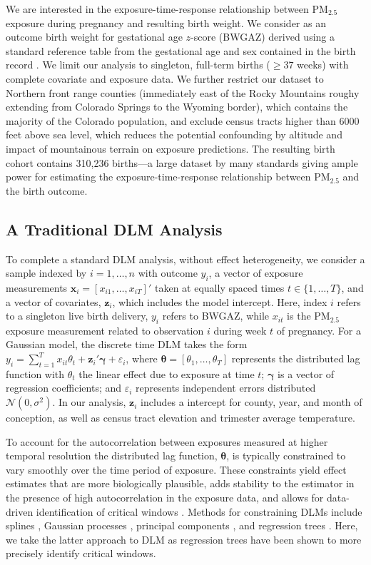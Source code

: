 \documentclass[12pt]{article}
\begin{document}
We are interested in the exposure-time-response relationship between PM$_{2.5}$ exposure during pregnancy and resulting birth weight. We consider as an outcome birth weight for gestational age $z$-score (BWGAZ) derived using a standard reference table from the gestational age and sex contained in the birth record \citep{Fenton2013AInfants}. We limit our analysis to singleton, full-term births ($\geq37$ weeks) with complete covariate and exposure data. We further restrict our dataset to Northern front range counties (immediately east of the Rocky Mountains roughy extending from Colorado Springs to the Wyoming border), which contains the majority of the Colorado population, and exclude census tracts higher than 6000 feet above sea level, which reduces the potential confounding by altitude and impact of mountainous terrain on exposure predictions. The resulting birth cohort contains 310,236 births---a large dataset by many standards giving ample power for estimating the exposure-time-response relationship between PM$_{2.5}$ and the birth outcome. 

\subsection{A Traditional DLM Analysis}\label{sec:tdlm_analysis}
To complete a standard DLM analysis, without effect heterogeneity, we consider a sample indexed by $i=1,\ldots,n$ with outcome $y_i$, a vector of exposure measurements $\mathbf{x}_i=[x_{i1},\ldots,x_{iT}]'$ taken at equally spaced times $t\in\{1,\ldots,T\}$, and a vector of covariates, $\mathbf{z}_i$, which includes the model intercept. Here, index $i$ refers to a singleton live birth delivery, $y_i$ refers to BWGAZ, while $x_{it}$ is the PM$_{2.5}$ exposure measurement related to observation $i$ during week $t$ of pregnancy. For a Gaussian model, the discrete time DLM takes the form $y_i=\sum_{t=1}^T x_{it}\theta_t+\mathbf{z}_i'\boldsymbol\gamma+\varepsilon_i$, where $\boldsymbol\theta=[\theta_1,\ldots,\theta_T]$ represents the distributed lag function with $\theta_t$ the linear effect due to exposure at time $t$; $\boldsymbol\gamma$ is a vector of regression coefficients; and $\varepsilon_i$ represents independent errors distributed $\mathcal{N}(0,\sigma^2)$. In our analysis, $\mathbf{z}_i$ includes a intercept for county, year, and month of conception, as well as census tract elevation and trimester average temperature. 

To account for the autocorrelation between exposures measured at higher temporal resolution the distributed lag function, $\boldsymbol\theta$, is typically constrained to vary smoothly over the time period of exposure. These constraints yield effect estimates that are more biologically plausible, adds stability to the estimator in the presence of high autocorrelation in the exposure data, and allows for data-driven identification of critical windows \citep{Wilson2017PotentialHealth}. Methods for constraining DLMs include splines \citep{Zanobetti2000}, Gaussian processes \citep{Warren2020}, principal components \citep{Wilson2017a}, and regression trees \citep{Mork2023EstimatingPairs}. Here, we take the latter approach to DLM as regression trees have been shown to more precisely identify critical windows. 
\end{document}
